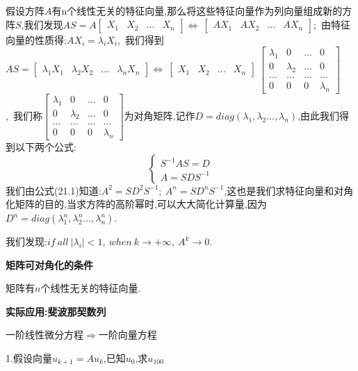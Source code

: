 \documentclass[oneside]{book}
\begin{document}
	假设方阵$A$有n个线性无关的特征向量,那么将这些特征向量作为列向量组成新的方阵$S$,我们发现$AS=A\left[\begin{array}{cccc}
		X_{1}&X_{2}&...&X_{n}
	\end{array}\right]\Leftrightarrow \ \left[\begin{array}{cccc}
	AX_{1}&AX_{2}&...&AX_{n}
\end{array}\right]$;\ 由特征向量的性质得:$AX_{i}=\lambda_{i}X_{i}$,\ 我们得到$AS=\left[\begin{array}{cccc}
\lambda_{1}X_{1}&\lambda_{2}X_{2}&...&\lambda_{n}X_{n}
\end{array}\right]\Leftrightarrow\ \left[\begin{array}{cccc}
X_{1}&X_{2}&...&X_{n}
\end{array}\right]\ \left[\begin{array}{cccc}
\lambda_{1}&0&...&0\\0&\lambda_{2}&...&0\\...&...&...&...\\0&0&0&\lambda_{n}
\end{array}\right]$,\ 我们称$\left[\begin{array}{cccc}
\lambda_{1}&0&...&0\\0&\lambda_{2}&...&0\\...&...&...&...\\0&0&0&\lambda_{n}
\end{array}\right]$为对角矩阵,记作$D=diag(\lambda_{1},\lambda_{2}...,\lambda_{n})$,由此我们得到以下两个公式:
\begin{equation}
	\left\{\begin{array}{c}
		S^{-1}AS=D\\
		A=SDS^{-1}
	\end{array}\right.
\end{equation}
我们由公式(21.1)知道:$A^{2}=SD^{2}S^{-1};\ A^{n}=SD^{n}S^{-1}$,这也是我们求特征向量和对角化矩阵的目的,当求方阵的高阶幂时,可以大大简化计算量,因为$D^{n}=diag(\lambda_{1}^{n},\lambda_{2}^{n}...,\lambda_{n}^{n})$.

我们发现:$if\ all\ |\lambda_{i}|<1,\ when\ k\rightarrow +\infty,\ A^{k}\rightarrow 0$.

\textbf{矩阵可对角化的条件}

矩阵有$n$个线性无关的特征向量.
	
	\textbf{实际应用:斐波那契数列}
	
	一阶线性微分方程$\Rightarrow$一阶向量方程
	
    1.假设向量$u_{k+1}=Au_{k}$,已知$u_{0}$,求$u_{100}$
    
\end{document}
